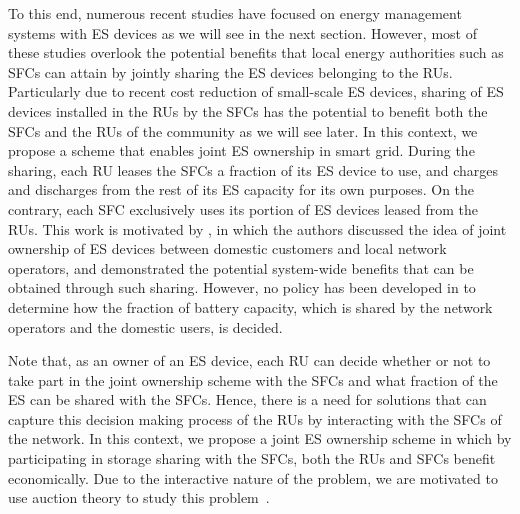 \documentclass[journal,10pt]{IEEEtran}
\begin{document}
To this end, numerous recent studies have focused on energy management systems with ES devices as we will see in the next section. However, most of these studies overlook the potential benefits that local energy authorities such as SFCs can attain by jointly sharing the ES devices belonging to the RUs. Particularly due to recent cost reduction of small-scale ES devices, sharing of ES devices installed in the RUs by the SFCs has the potential to benefit both the SFCs and the RUs of the community as we will see later. In this context, we propose a scheme that enables joint ES ownership in smart grid. During the sharing, each RU leases the SFCs a fraction of its ES device to use, and charges and discharges from the rest of its ES capacity for its own purposes. On the contrary, each SFC exclusively uses its portion of ES devices leased from the RUs. This work is motivated by \cite{Wang-JTSG:2013}, in which the authors discussed the idea of joint ownership of ES devices between domestic customers and local network operators, and demonstrated the potential system-wide benefits that can be obtained through such sharing. However, no policy has been developed in \cite{Wang-JTSG:2013} to determine how the fraction of battery capacity, which is shared by the network operators and the domestic users, is decided.

Note that, as an owner of an ES device, each RU can decide whether or not to take part in the joint ownership scheme with the SFCs and what fraction of the ES can be shared with the SFCs. Hence, there is a need for solutions that can capture this decision making process of the RUs by interacting with the SFCs of the network. In this context, we propose a joint ES ownership scheme in which by participating in storage sharing with the SFCs, both the RUs and SFCs benefit economically. Due to the interactive nature of the problem, we are motivated to use auction theory to study this problem~\cite{klemperer-JES:1999}.
\end{document}
